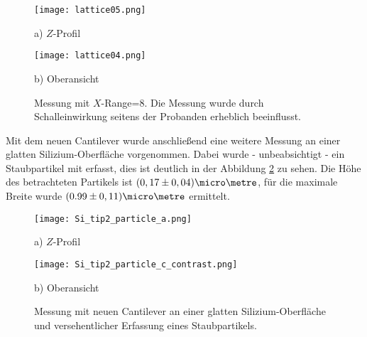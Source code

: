 \begin{figure}[H]
\centering
\begin{minipage}{0.45\textwidth}
\centering
		\texttt{[image: lattice05.png]}
		\caption*{a) $Z$-Profil}
	\end{minipage}
	\hfill
\begin{minipage}{0.45\textwidth}
\centering
		\texttt{[image: lattice04.png]}
		\caption*{b) Oberansicht}
	\end{minipage}
	\caption[Messung mit $X$-Range=8\micro\metre]{Messung mit $X$-Range=8\micro\metre. Die Messung wurde durch Schalleinwirkung seitens der Probanden erheblich beeinflusst.}
	\label{fig:Lattice2}
\end{figure}

Mit dem neuen Cantilever wurde anschließend eine weitere Messung an einer glatten Silizium-Oberfläche vorgenommen. Dabei wurde - unbeabsichtigt - ein Staubpartikel mit erfasst, dies ist deutlich in der Abbildung \ref{fig:Si_particle} zu sehen. Die Höhe des betrachteten Partikels ist $(0,17 \pm 0,04)\micro\metre$, für die maximale Breite wurde $(0.99 \pm 0,11)\micro\metre$ ermittelt.
\begin{figure}[H]
\centering
	\begin{minipage}{0.45\textwidth}
	\centering
		\texttt{[image: Si\_tip2\_particle\_a.png]}
		\caption*{a) $Z$-Profil}
	\end{minipage}
	\hfill
	\begin{minipage}{0.45\textwidth}
	\centering
		\texttt{[image: Si\_tip2\_particle\_c\_contrast.png]}
	\caption*{b) Oberansicht}
	\end{minipage}
	\caption[Messung mit Staubpartikel]{Messung mit neuen Cantilever an einer glatten Silizium-Oberfläche und versehentlicher Erfassung eines Staubpartikels.}
	\label{fig:Si_particle}
\end{figure}

